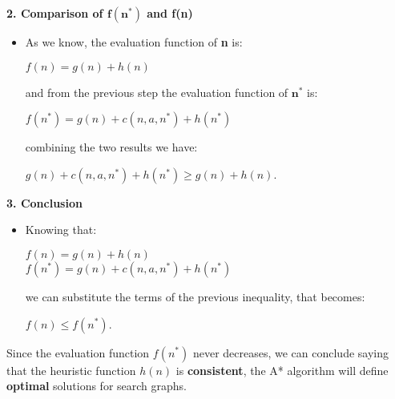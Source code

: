 \begin{example}
    \textbf{2. Comparison of $\mathbf{f(n^*)}$ and f(n)}
    \begin{itemize}
        \renewcommand{\labelitemi}{}
        \item \vspace{3.5pt}
        As we know, the evaluation function of \textbf{n} is: \vspace{3.5pt}
        \begin{center}
            $f(n) = g(n) + h(n)$
        \end{center} \vspace{3.5pt}

        and from the previous step the evaluation function of $\mathbf{n^*}$ is: \vspace{3.5pt}
        \begin{center}
            $f(n^*) = g(n) + c(n, a, n^*) + h(n^*)$
        \end{center} \vspace{3.5pt}

        combining the two results we have: \vspace{3.5pt}
        \begin{center}
            $g(n) + c(n, a, n^*) + h(n^*) \ge g(n) + h(n)$.
        \end{center} \vspace{3.5pt}
    \end{itemize}

    \textbf{3. Conclusion}
    \begin{itemize}
        \renewcommand{\labelitemi}{}
        \item \vspace{3.5pt}
        Knowing that: \vspace{3.5pt}
        \begin{center}
            $f(n) = g(n) + h(n)$ \\
            $f(n^*) = g(n) + c(n, a, n^*) + h(n^*)$
        \end{center} \vspace{3.5pt}

        we can substitute the terms of the previous inequality, that becomes: \vspace{3.5pt}
        \begin{center}
            $f(n) \le f(n^*)$.
        \end{center} \vspace{3.5pt}
    \end{itemize}

    Since the evaluation function $f(n^*)$ never decreases, we can conclude saying that the heuristic function $h(n)$ is \textbf{consistent}, the A* algorithm will define 
    \textbf{optimal} solutions for search graphs.
\end{example}